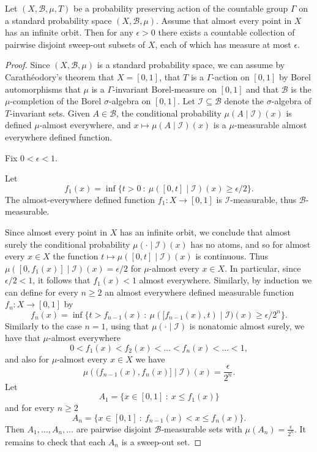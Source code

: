 \documentclass[12pt,reqno]{amsart}
\begin{document}
\begin{lemma}\label{lem:sweep_out_partition}
    Let $(X,\mathcal{B},\mu,T)$ be a probability preserving action of the countable group $\Gamma$ on a standard  probability space $(X,\mathcal{B},\mu)$. Assume that almost every point in $X$ has an infinite orbit. 
    Then for any $\epsilon >0$ there exists a countable collection of pairwise disjoint sweep-out subsets of  $X$, each of which has measure at most $\epsilon$.
\end{lemma}
\begin{proof}
    Since $(X,\mathcal{B},\mu)$ is a standard probability space, we can assume by  Carath{\'e}odory's theorem that $X=[0,1]$,  that $T$ is a $\Gamma$-action on $[0,1]$ by Borel automorphisms that $\mu$ is a  $\Gamma$-invariant Borel-measure on $[0,1]$ and that $\mathcal{B}$ is the $\mu$-completion of the Borel $\sigma$-algebra on $[0,1]$.
    Let $\mathcal{I} \subseteq \mathcal{B}$ denote the $\sigma$-algebra of $T$-invariant sets. Given $A \in \mathcal{B}$, the conditional probability $\mu(A \mid \mathcal{I})(x)$ is defined $\mu$-almost everywhere, and $x \mapsto \mu(A \mid \mathcal{I})(x)$ is a $\mu$-measurable  almost everywhere defined function.

Fix $0 < \epsilon < 1$.

Let 
\[
f_1(x) = \inf \{ t >0~:~ \mu( [0,t] \mid \mathcal{I})(x) \ge \epsilon/2\}.
\]
The almost-everywhere defined function $f_1:X \to [0,1]$ is $\mathcal{I}$-measurable, thus $\mathcal{B}$-measurable.

Since almost every point in $X$ has an infinite orbit,  we conclude that almost surely the conditional probability $\mu(\cdot \mid \mathcal{I})(x)$ has no atoms, and so  for almost every $x \in X$ the function $t \mapsto  \mu([0,t] \mid \mathcal{I})(x)$ is continuous. Thus $\mu([0,f_1(x)] \mid \mathcal{I})(x) = \epsilon/2$ for $\mu$-almost every $x \in X$. In particular, since $\epsilon /2 < 1$, it follows that $f_1(x) < 1$ almost everywhere.
Similarly, by induction  we can define for every $n \ge 2$ an almost everywhere defined measurable function  $f_{n}:X \to [0,1]$ by
\[
f_n(x) = \inf \{ t >f_{n-1}(x) ~:~ \mu( [f_{n-1}(x),t) \mid \mathcal{I})(x) \ge \epsilon/2^n\}.
\]
Similarly to the case $n=1$, using that $\mu(
\cdot 
\mid \mathcal{I})$ is nonatomic almost surely, we have that  $\mu$-almost everywhere
\[ 0 < f_1(x) < f_2(x) < \ldots < f_n(x) < \ldots < 1,\]
and also for  $\mu$-almost every $x \in X$ we have
\[ \mu\left( (f_{n-1}(x),f_n(x)] \mid \mathcal{I}\right)(x) = \frac{\epsilon}{2^n}. \]
Let
\[
A_1 = \{ x \in [0,1]~:~ x \le f_1(x)\}
\]
and for every $n \ge 2$
\[
A_n = \{ x \in [0,1]~:~ f_{n-1}(x) < x \le f_n(x)\}.
\]
Then $A_1,\ldots,A_n,\ldots$ are pairwise disjoint $\mathcal{B}$-measurable sets with $\mu(A_n) = \frac{\epsilon}{2^n}$.
It remains to check that each $A_n$ is a sweep-out set.


\end{proof}
\end{document}
